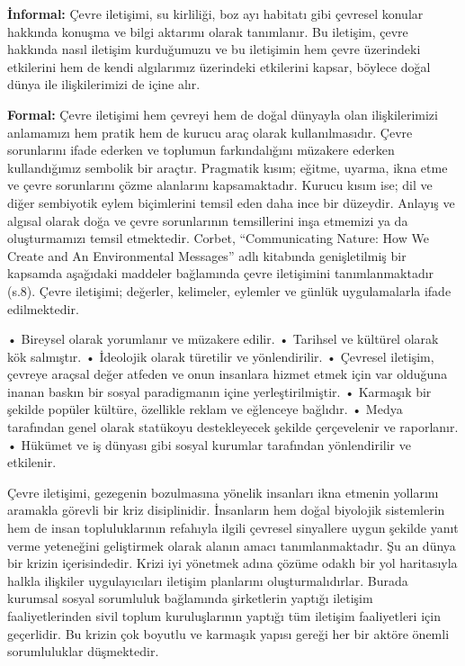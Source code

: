 \documentclass[
]{book}
\begin{document}
\textbf{İnformal:} Çevre iletişimi, su kirliliği, boz ayı habitatı gibi çevresel konular hakkında konuşma ve bilgi aktarımı olarak tanımlanır. Bu iletişim, çevre hakkında nasıl iletişim kurduğumuzu ve bu iletişimin hem çevre üzerindeki etkilerini hem de kendi algılarımız üzerindeki etkilerini kapsar, böylece doğal dünya ile ilişkilerimizi de içine alır.

\textbf{Formal:} Çevre iletişimi hem çevreyi hem de doğal dünyayla olan ilişkilerimizi anlamamızı hem pratik hem de kurucu araç olarak kullanılmasıdır. Çevre sorunlarını ifade ederken ve toplumun farkındalığını müzakere ederken kullandığımız sembolik bir araçtır. Pragmatik kısım; eğitme, uyarma, ikna etme ve çevre sorunlarını çözme alanlarını kapsamaktadır. Kurucu kısım ise; dil ve diğer sembiyotik eylem biçimlerini temsil eden daha ince bir düzeydir. Anlayış ve algısal olarak doğa ve çevre sorunlarının temsillerini inşa etmemizi ya da oluşturmamızı temsil etmektedir.
Corbet, ``Communicating Nature: How We Create and An Environmental Messages'' adlı kitabında genişletilmiş bir kapsamda aşağıdaki maddeler bağlamında çevre iletişimini tanımlanmaktadır (s.8). \citep{corbett2006} Çevre iletişimi; değerler, kelimeler, eylemler ve günlük uygulamalarla ifade edilmektedir.

• Bireysel olarak yorumlanır ve müzakere edilir.
• Tarihsel ve kültürel olarak kök salmıştır.
• İdeolojik olarak türetilir ve yönlendirilir.
• Çevresel iletişim, çevreye araçsal değer atfeden ve onun insanlara hizmet etmek için var olduğuna inanan baskın bir sosyal paradigmanın içine yerleştirilmiştir.
• Karmaşık bir şekilde popüler kültüre, özellikle reklam ve eğlenceye bağlıdır.
• Medya tarafından genel olarak statükoyu destekleyecek şekilde çerçevelenir ve raporlanır.
• Hükümet ve iş dünyası gibi sosyal kurumlar tarafından yönlendirilir ve etkilenir.

Çevre iletişimi, gezegenin bozulmasına yönelik insanları ikna etmenin yollarını aramakla görevli bir kriz disiplinidir. İnsanların hem doğal biyolojik sistemlerin hem de insan topluluklarının refahıyla ilgili çevresel sinyallere uygun şekilde yanıt verme yeteneğini geliştirmek olarak alanın amacı tanımlanmaktadır. Şu an dünya bir krizin içerisindedir. Krizi iyi yönetmek adına çözüme odaklı bir yol haritasıyla halkla ilişkiler uygulayıcıları iletişim planlarını oluşturmalıdırlar. Burada kurumsal sosyal sorumluluk bağlamında şirketlerin yaptığı iletişim faaliyetlerinden sivil toplum kuruluşlarının yaptığı tüm iletişim faaliyetleri için geçerlidir. Bu krizin çok boyutlu ve karmaşık yapısı gereği her bir aktöre önemli sorumluluklar düşmektedir.
\end{document}
